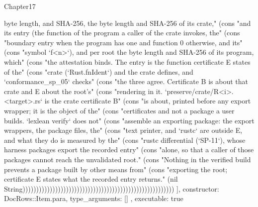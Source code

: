 \begin{lexlean}{Chapter17}
\begin{semanticmodule}
{{byte length, and SHA-256, the byte length and SHA-256 of its crate," (cons "and its entry (the function of the program a caller of the crate invokes, the" (cons "boundary entry when the program has one and function 0 otherwise, and its" (cons "symbol `f<n>`), and per root the byte length and SHA-256 of its program, which" (cons "the attestation binds. The entry is the function certificate E states of the" (cons "crate (`Rust.fnIdent`) and the crate defines, and `conformance_sp_05` checks" (cons "the three agree. Certificate B is about that crate and E about the root's" (cons "rendering in it. `preserve/crate/R<i>.<target>.rs` is the crate certificate B" (cons "is about, printed before any export wrapper; it is the object of the" (cons "certificates and not a package a user builds. `lexlean verify` does not" (cons "assemble an exporting package: the export wrappers, the package files, the" (cons "text printer, and `rustc` are outside E, and what they do is measured by the" (cons "rustc differential (`SP-11`), whose harness packages export the recorded entry" (cons "alone, so that a caller of those packages cannot reach the unvalidated root." (cons "Nothing in the verified build prevents a package built by other means from" (cons "exporting the root; certificate E states what the recorded entry returns." (nil String))))))))))))))))))))))))))))))))))))))))))))))))))))))))
    ],
    constructor: DocRows::Item.para,
    type_arguments: []
  },
  executable: true
}


\end{semanticmodule}
\end{lexlean}
